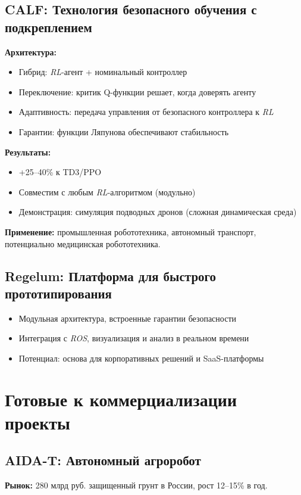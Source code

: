 \documentclass[12pt,a4paper]{article}
\begin{document}
\subsection{CALF: Технология безопасного обучения с подкреплением}
\textbf{Архитектура:}
\begin{itemize}
    \item Гибрид: \textit{RL}-агент + номинальный контроллер
    \item Переключение: критик Q-функции решает, когда доверять агенту
    \item Адаптивность: передача управления от безопасного контроллера к \textit{RL}
    \item Гарантии: функции Ляпунова обеспечивают стабильность
\end{itemize}
\textbf{Результаты:}
\begin{itemize}
    \item +25–40\% к TD3/PPO
    \item Совместим с любым \textit{RL}-алгоритмом (модульно)
    \item Демонстрация: симуляция подводных дронов (сложная динамическая среда)
\end{itemize}
\textbf{Применение:} промышленная робототехника, автономный транспорт, потенциально медицинская робототехника.

\subsection{Regelum: Платформа для быстрого прототипирования}
\begin{itemize}
    \item Модульная архитектура, встроенные гарантии безопасности
    \item Интеграция с \textit{ROS}, визуализация и анализ в реальном времени
    \item Потенциал: основа для корпоративных решений и SaaS-платформы
\end{itemize}

\section{Готовые к коммерциализации проекты}
\subsection{AIDA-T: Автономный агроробот}
\textbf{Рынок:} 280 млрд руб. защищенный грунт в России, рост 12–15\% в год.
\end{document}
